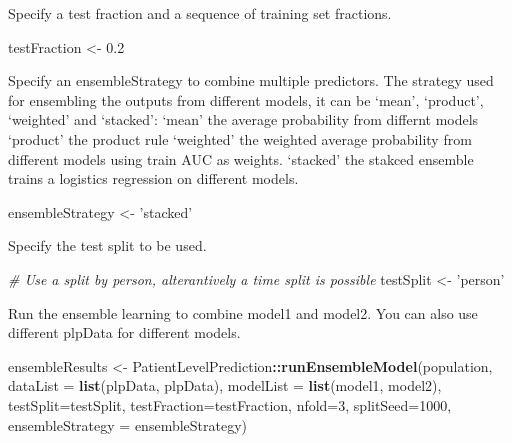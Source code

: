 \documentclass[
]{article}
\newenvironment{Shaded}{\begin{snugshade}}{\end{snugshade}}
\newcommand{\CommentTok}[1]{\textcolor[rgb]{0.56,0.35,0.01}{\textit{#1}}}
\newcommand{\DataTypeTok}[1]{\textcolor[rgb]{0.13,0.29,0.53}{#1}}
\newcommand{\DecValTok}[1]{\textcolor[rgb]{0.00,0.00,0.81}{#1}}
\newcommand{\FloatTok}[1]{\textcolor[rgb]{0.00,0.00,0.81}{#1}}
\newcommand{\KeywordTok}[1]{\textcolor[rgb]{0.13,0.29,0.53}{\textbf{#1}}}
\newcommand{\NormalTok}[1]{#1}
\newcommand{\OperatorTok}[1]{\textcolor[rgb]{0.81,0.36,0.00}{\textbf{#1}}}
\newcommand{\StringTok}[1]{\textcolor[rgb]{0.31,0.60,0.02}{#1}}
\begin{document}
Specify a test fraction and a sequence of training set fractions.

\begin{Shaded}
\begin{Highlighting}[]
\NormalTok{testFraction <-}\StringTok{ }\FloatTok{0.2}
\end{Highlighting}
\end{Shaded}

Specify an ensembleStrategy to combine multiple predictors. The strategy
used for ensembling the outputs from different models, it can be `mean',
`product', `weighted' and `stacked': `mean' the average probability from
differnt models `product' the product rule `weighted' the weighted
average probability from different models using train AUC as weights.
`stacked' the stakced ensemble trains a logistics regression on
different models.

\begin{Shaded}
\begin{Highlighting}[]
\NormalTok{ensembleStrategy <-}\StringTok{ 'stacked'}
\end{Highlighting}
\end{Shaded}

Specify the test split to be used.

\begin{Shaded}
\begin{Highlighting}[]
\CommentTok{# Use a split by person, alterantively a time split is possible}
\NormalTok{testSplit <-}\StringTok{ 'person'}
\end{Highlighting}
\end{Shaded}

Run the ensemble learning to combine model1 and model2. You can also use
different plpData for different models.

\begin{Shaded}
\begin{Highlighting}[]
\NormalTok{ensembleResults <-}\StringTok{ }\NormalTok{PatientLevelPrediction}\OperatorTok{::}\KeywordTok{runEnsembleModel}\NormalTok{(population, }
                                   \DataTypeTok{dataList =} \KeywordTok{list}\NormalTok{(plpData, plpData), }
                                   \DataTypeTok{modelList =} \KeywordTok{list}\NormalTok{(model1, model2),}
                                   \DataTypeTok{testSplit=}\NormalTok{testSplit,}
                                   \DataTypeTok{testFraction=}\NormalTok{testFraction,}
                                   \DataTypeTok{nfold=}\DecValTok{3}\NormalTok{, }\DataTypeTok{splitSeed=}\DecValTok{1000}\NormalTok{, }
                                   \DataTypeTok{ensembleStrategy =}\NormalTok{ ensembleStrategy) }
\end{Highlighting}
\end{Shaded}
\end{document}
